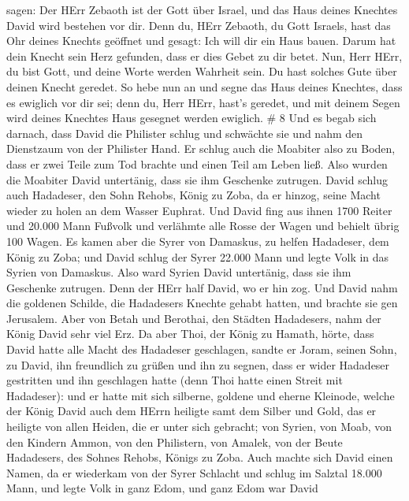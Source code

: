 sagen: Der HErr Zebaoth ist der Gott über Israel, und das Haus deines
Knechtes David wird bestehen vor dir.  Denn du, HErr
Zebaoth, du Gott Israels, hast das Ohr deines Knechts geöffnet und
gesagt: Ich will dir ein Haus bauen. Darum hat dein Knecht sein Herz
gefunden, dass er dies Gebet zu dir betet.  Nun, Herr HErr,
du bist Gott, und deine Worte werden Wahrheit sein. Du hast solches Gute
über deinen Knecht geredet.  So hebe nun an und segne das
Haus deines Knechtes, dass es ewiglich vor dir sei; denn du, Herr HErr,
hast's geredet, und mit deinem Segen wird deines Knechtes Haus gesegnet
werden ewiglich. \# 8  Und es begab sich darnach, dass David
die Philister schlug und schwächte sie und nahm den Dienstzaum von der
Philister Hand.  Er schlug auch die Moabiter also zu Boden,
dass er zwei Teile zum Tod brachte und einen Teil am Leben ließ. Also
wurden die Moabiter David untertänig, dass sie ihm Geschenke zutrugen.
 David schlug auch Hadadeser, den Sohn Rehobs, König zu
Zoba, da er hinzog, seine Macht wieder zu holen an dem Wasser Euphrat.
 Und David fing aus ihnen 1700 Reiter und 20.000 Mann
Fußvolk und verlähmte alle Rosse der Wagen und behielt übrig 100 Wagen.
 Es kamen aber die Syrer von Damaskus, zu helfen Hadadeser,
dem König zu Zoba; und David schlug der Syrer 22.000 Mann 
und legte Volk in das Syrien von Damaskus. Also ward Syrien David
untertänig, dass sie ihm Geschenke zutrugen. Denn der HErr half David,
wo er hin zog.  Und David nahm die goldenen Schilde, die
Hadadesers Knechte gehabt hatten, und brachte sie gen Jerusalem.
 Aber von Betah und Berothai, den Städten Hadadesers, nahm
der König David sehr viel Erz.  Da aber Thoi, der König zu
Hamath, hörte, dass David hatte alle Macht des Hadadeser geschlagen,
 sandte er Joram, seinen Sohn, zu David, ihn freundlich zu
grüßen und ihn zu segnen, dass er wider Hadadeser gestritten und ihn
geschlagen hatte (denn Thoi hatte einen Streit mit Hadadeser): und er
hatte mit sich silberne, goldene und eherne Kleinode, 
welche der König David auch dem HErrn heiligte samt dem Silber und Gold,
das er heiligte von allen Heiden, die er unter sich gebracht;
 von Syrien, von Moab, von den Kindern Ammon, von den
Philistern, von Amalek, von der Beute Hadadesers, des Sohnes Rehobs,
Königs zu Zoba.  Auch machte sich David einen Namen, da er
wiederkam von der Syrer Schlacht und schlug im Salztal 18.000 Mann,
 und legte Volk in ganz Edom, und ganz Edom war David
